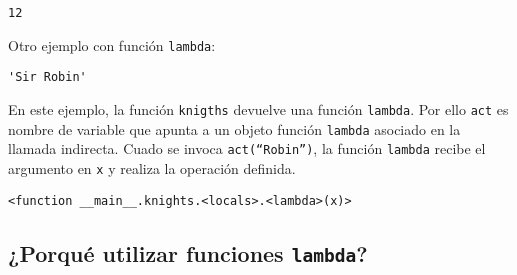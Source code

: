 \begin{Shaded}
\begin{Highlighting}[]
\OperatorTok{=} \OperatorTok{+}\OperatorTok{+}
\NormalTok{,}\NormalTok{,}\NormalTok{)}
\end{Highlighting}
\end{Shaded}

\begin{verbatim}
12
\end{verbatim}

Otro ejemplo con función \texttt{lambda}:

\begin{Shaded}
\begin{Highlighting}[]
\OperatorTok{=} 
\OperatorTok{=} \OperatorTok{+} \StringTok{\textquotesingle{} \textquotesingle{}} \OperatorTok{+}

\OperatorTok{=}
\NormalTok{)}
\end{Highlighting}
\end{Shaded}

\begin{verbatim}
'Sir Robin'
\end{verbatim}

En este ejemplo, la función \texttt{knigths} devuelve una función
\texttt{lambda}. Por ello \texttt{act} es nombre de variable que apunta
a un objeto función \texttt{lambda} asociado en la llamada indirecta.
Cuado se invoca \texttt{act(``Robin'')}, la función \texttt{lambda} recibe
el argumento en \texttt{x} y realiza la operación definida.

\begin{Shaded}
\begin{Highlighting}[]
\end{Highlighting}
\end{Shaded}

\begin{verbatim}
<function __main__.knights.<locals>.<lambda>(x)>
\end{verbatim}

\subsection{\texorpdfstring{¿Porqué utilizar funciones \texttt{lambda}?}{¿Porqué utilizar funciones lambda?}}

